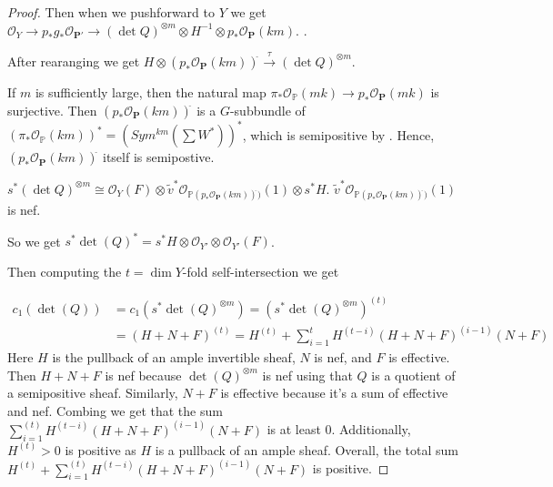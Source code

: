 \begin{proof}
Then when we pushforward to $Y$ we get $\mathcal{O}_Y\to p_*g_*\mathcal{O}_{\mathbf{P}'}\to (\det Q)^{\otimes m}\otimes H^{-1}\otimes p_*\mathcal{O}_{\mathbf{P}}(km)$. .

After rearanging we get $H\otimes (p_*\mathcal{O}_{\mathbf{P}}(km))^{\check{}}\stackrel{\tau}\to (\det Q)^{\otimes m}$. 

If $m$ is sufficiently large, then the natural map $\pi_*\mathcal{O}_{\mathbb{P}}(mk)\to p_*\mathcal{O}_{\mathbf{P}}(mk) $ is surjective. Then $(p_*\mathcal{O}_{\mathbf{P}}(km))^{\check{}}$ is a $G$-subbundle  of $(\pi_*\mathcal{O}_{\mathbb{P}}(km))^*=(Sym^{km}(\sum W^*))^*$, which is semipositive by . Hence, $(p_*\mathcal{O}_{\mathbf{P}}(km))^{\check{}}$  itself is semipostive. 

$s^*(\det Q)^{\otimes m}\cong \mathcal{O}_Y(F)\otimes \tilde{v}^*\mathcal{O}_{\mathbb{P}(p_*\mathcal{O}_{\mathbf{P}}(km))^{\check{}})}(1)\otimes s^*H$.  $\tilde{v}^*\mathcal{O}_{\mathbb{P}(p_*\mathcal{O}_{\mathbf{P}}(km))^{\check{}})}(1)$ is nef. 
  
So we get   
$s^*\det(Q)^*=s^*H\otimes \mathcal{O}_{Y'}\otimes \mathcal{O}_{Y'}(F)$.   

Then computing the $t=\dim Y$-fold self-intersection we get 

\begin{align*}
c_1(\det(Q)) & =c_1(s^*\det(Q)^{\otimes m})=(s^*\det(Q)^{\otimes m})^{(t)}\\ & =(H+N+F)^{(t)}=H^{(t)}+\sum\limits_{i=1}^{t} H^{(t-i)}(H+N+F)^{(i-1)}(N+F)
\end{align*} 
 Here $H$ is the pullback of an ample invertible sheaf, $N$ is nef, and $F$ is effective. Then $H+N+F$ is nef because $\det(Q)^{\otimes m}$ is nef using that $Q$ is a quotient of a semipositive sheaf.  Similarly, $N+F$ is effective because it's a sum of effective and nef. Combing we get that the sum $\sum\limits_{i=1}^{(t)} H^{(t-i)}(H+N+F)^{(i-1)}(N+F)$ is at least 0. Additionally, $H^{(t)}>0$ is positive as $H$ is a pullback of an ample sheaf. Overall, the total sum $H^{(t)}+\sum\limits_{i=1}^{(t)} H^{(t-i)}(H+N+F)^{(i-1)}(N+F)$ is positive. 


  
\end{proof}





